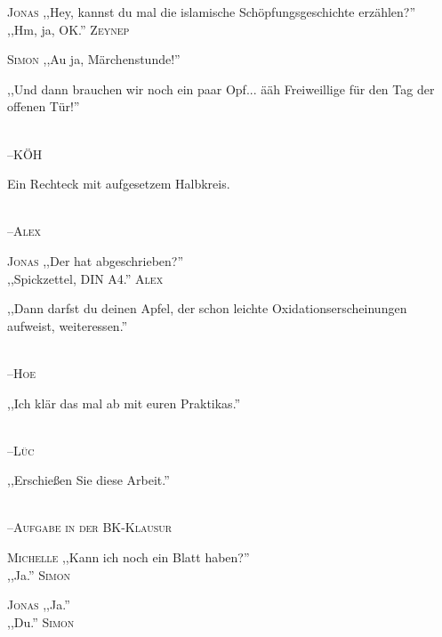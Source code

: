 \vspace{3mm}
\hangindent=0.7cm
\raggedright \textsc{\footnotesize Jonas} ,,Hey, kannst du mal die islamische Schöpfungsgeschichte erzählen?''\\
\raggedleft ,,Hm, ja, OK.'' \textsc{\footnotesize Zeynep}\\
\hangindent=0.7cm
\raggedright \textsc{\footnotesize Simon} ,,Au ja, Märchenstunde!''\\

\vspace{3mm}
{\raggedright ,,Und dann brauchen wir noch ein paar Opf... ääh Freiweillige für den Tag der offenen Tür!''}\\
\raggedleft \textsc{\footnotesize --\/KÖH}\\

\vspace{3mm}
{\raggedright Ein Rechteck mit aufgesetzem Halbkreis.}\\
\raggedleft \textsc{\footnotesize --\/Alex}\\

\vspace{3mm}
\hangindent=0.7cm
\raggedright \textsc{\footnotesize Jonas} ,,Der hat abgeschrieben?''\\
\raggedleft ,,Spickzettel, DIN A4.'' \textsc{\footnotesize Alex}\\

\vspace{3mm}
{\raggedright ,,Dann darfst du deinen Apfel, der schon leichte Oxidationserscheinungen aufweist, weiteressen.''}\\
\raggedleft \textsc{\footnotesize --\/Hoe}\\

\vspace{3mm}
{\raggedright ,,Ich klär das mal ab mit euren Praktikas.''}\\
\raggedleft \textsc{\footnotesize --\/Lüc}\\

\vspace{3mm}
{\raggedright ,,Erschießen Sie diese Arbeit.''}\\
\raggedleft \textsc{\footnotesize --\/Aufgabe in der BK-Klausur}\\

\vspace{3mm}
\hangindent=0.7cm
\raggedright \textsc{\footnotesize Michelle} ,,Kann ich noch ein Blatt haben?''\\
\raggedleft ,,Ja.'' \textsc{\footnotesize Simon}\\
\hangindent=0.7cm
\raggedright \textsc{\footnotesize Jonas} ,,Ja.''\\
\raggedleft ,,Du.'' \textsc{\footnotesize Simon}\\

